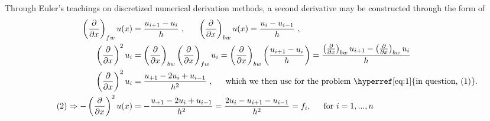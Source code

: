 \documentclass[11pt,a4paper,notitlepage]{article}
\newcommand\pd[2]{\frac{\partial #1}{\partial #2}}
\begin{document}
Through Euler's teachings on discretized numerical derivation methods, a second derivative may be constructed through the form of
\begin{align*}
\left(\pd{}{x}\right)_{fw}u(x) &= \frac{u_{i+1} - u_i}{h}\ , \indent
\left(\pd{}{x}\right)_{bw}u(x) = \frac{u_{i} - u_{i-1}}{h}\ , \\
\left(\pd{}{x}\right)^2u_i &= \left(\pd{}{x}\right)_{bw}\left(\pd{}{x}\right)_{fw}u_i = \left(\pd{}{x}\right)_{bw}\left(\frac{u_{i+1} - u_i}{h}\right) =\frac{\left(\pd{}{x}\right)_{bw}u_{i+1} - \left(\pd{}{x}\right)_{bw}u_i}{h} \\
\left(\pd{}{x}\right)^2u_i &= \frac{u_{+1} - 2u_i + u_{i-1}}{h^2}\ , \indent \text{which we then use for the problem \hyperref[eq:1]{in question, (1)}.}\\
\label{eq:2} \tag{2}
\Rightarrow -\left(\pd{}{x}\right)^2 u(x) &= - \frac{u_{+1} - 2u_i + u_{i-1}}{h^2} = \frac{2u_i - u_{i+1} - u_{i-1}}{h^2} = f_i , \indent \text{for}\ i = 1,...,n
\end{align*}
\end{document}
